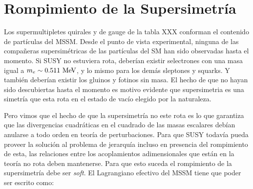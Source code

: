 





\section{Rompimiento de la Supersimetría}

Los supermultipletes quirales y de gauge de la tabla XXX conforman el contenido
de partículas del MSSM. Desde el punto de vista experimental, ninguna de las
compa\~neras supersimétricas de las partículas del SM han sido observadas hasta
el momento.
Si SUSY no estuviera rota, deberían existir selectrones con una masa igual
a $m_e \sim 0.511 \mev$, y lo mismo para los demás sleptones y squarks. Y también
deberían existir los gluinos y fotinos sin masa.
El hecho de que no hayan sido descubiertas hasta el momento es motivo evidente
que supersimetria es una simetría que esta rota en el estado de vacío elegido
por la naturaleza.

Pero vimos que el hecho de que la supersimetría no este rota es lo que garantiza
que las divergencias cuadráticas en el cuadrado de las masas escalares
debían anularse a todo orden en teoría de perturbaciones.
Para que SUSY todavía pueda proveer la solución al problema de jerarquía incluso
en presencia del rompimiento de esta, las relaciones entre los acoplamientos
adimensionales que están en la teoría no rota deben mantenerse.
Para que esto suceda el rompimiento de la supersimetría debe ser \emph{soft}.
El Lagrangiano efectivo del MSSM tiene que poder ser escrito como:

